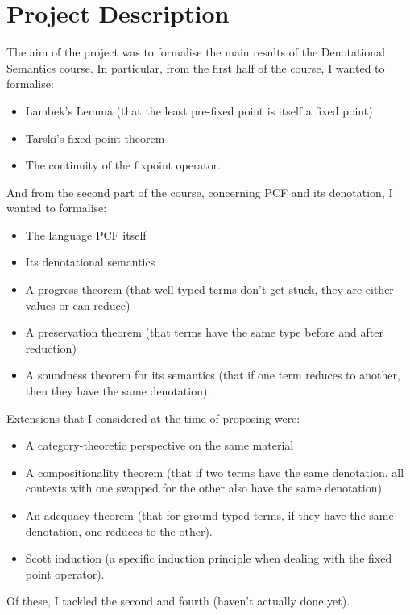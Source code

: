 \documentclass[12pt,a4paper,twoside,openright]{report}
\begin{document}
\section{Project Description}
The aim of the project was to formalise the main results of the Denotational Semantics course. In particular, from the first half of the course, I wanted to formalise:
\begin{itemize}
\item Lambek's Lemma (that the least pre-fixed point is itself a fixed point)
\item Tarski's fixed point theorem
\item The continuity of the fixpoint operator.
\end{itemize}
And from the second part of the course, concerning PCF and its denotation, I wanted to formalise:
\begin{itemize}
\item The language PCF itself
\item Its denotational semantics
\item A progress theorem (that well-typed terms don't get stuck, they are either values or can reduce)
\item A preservation theorem (that terms have the same type before and after reduction)
\item A soundness theorem for its semantics (that if one term reduces to another, then they have the same denotation).
\end{itemize}
Extensions that I considered at the time of proposing were:
\begin{itemize}
\item A category-theoretic perspective on the same material
\item A compositionality theorem (that if two terms have the same denotation, all contexts with one swapped for the other also have the same denotation)
\item An adequacy theorem (that for ground-typed terms, if they have the same denotation, one reduces to the other). 
\item Scott induction (a specific induction principle when dealing with the fixed point operator). 
\end{itemize}
Of these, I tackled the second and fourth (haven't actually done yet).
\end{document}
